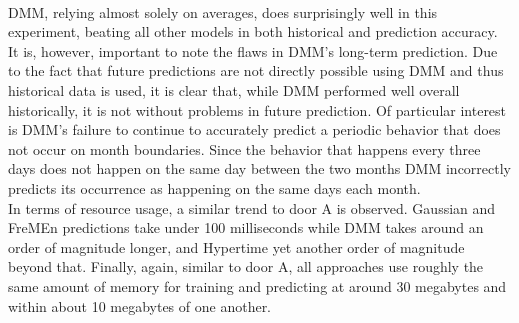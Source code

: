 \begin{table}[h!]
  \centering
  \caption{Door B Data Overview}
\end{table} \\

DMM, relying almost solely on averages, does surprisingly well in this
experiment, beating all other models in both historical and prediction
accuracy. It is, however, important to note the flaws in DMM's long-term
prediction. Due to the fact that future predictions are not directly possible
using DMM and thus historical data is used, it is clear that,
while DMM performed well overall historically, it is not without problems
in future prediction. Of particular interest is DMM's failure to continue to
accurately predict a periodic behavior that does not occur on month
boundaries. Since the behavior that happens every three days does not happen
on the same day between the two months DMM incorrectly predicts its
occurrence as happening on the same days each month. \\

In terms of resource usage, a similar trend to door A is observed. Gaussian
and FreMEn predictions take under 100 milliseconds while DMM takes around
an order of magnitude longer, and Hypertime yet another order of magnitude
beyond that. Finally, again, similar to door A, all approaches use roughly the same amount
of memory for training and predicting at around 30 megabytes and
within about 10 megabytes of one another. \\

